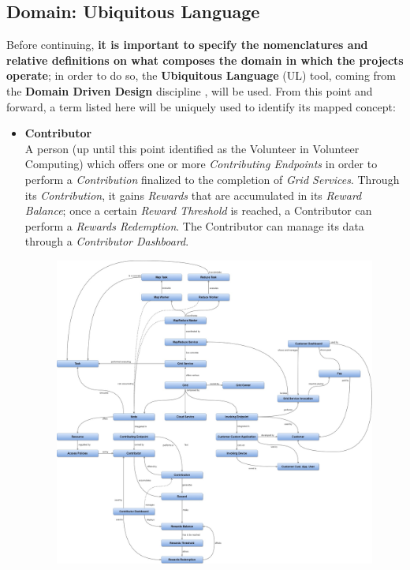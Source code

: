 \subsection{Domain: Ubiquitous Language}\label{ubiquitous_language}
Before continuing, \textbf{it is important to specify the nomenclatures and relative definitions on what composes the domain in which the projects operate}; in order to do so, the \textbf{Ubiquitous Language} (UL) tool, coming from the \textbf{Domain Driven Design} discipline \cite{ddd}, will be used. From this point and forward, a term listed here will be uniquely used to identify its mapped concept:
\begin{itemize}
    \item \textbf{Contributor}\label{contributor}\\
    A person (up until this point identified as the Volunteer in Volunteer Computing) which offers one or more \textit{Contributing Endpoints} in order to perform a \textit{Contribution} finalized to the completion of \textit{Grid Services}. Through its \textit{Contribution}, it gains \textit{Rewards} that are accumulated in its \textit{Reward Balance}; once a certain \textit{Reward Threshold} is reached, a Contributor can perform a \textit{Rewards Redemption}. The Contributor can manage its data through a \textit{Contributor Dashboard}.
    \vspace{10mm}
    \begin{figure}[!ht]
        \centering
        \includegraphics[width=\linewidth]{document/chapters/chapter_5/images/ul.jpg}

\end{figure}
\end{itemize}
